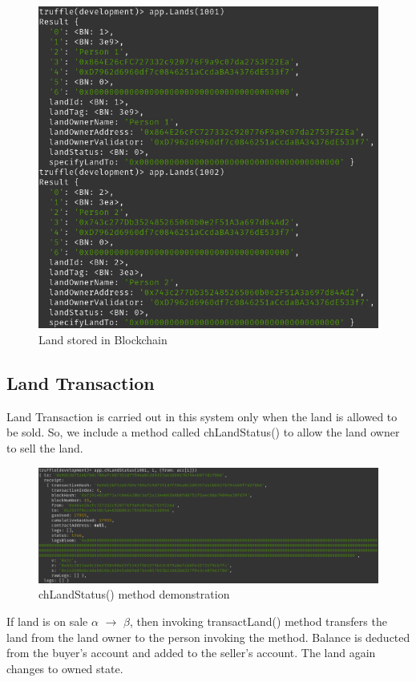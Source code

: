 \documentclass[11pt]{article}
\begin{document}
\begin{figure}[htbp]
\centering
\includegraphics[width=.9\linewidth]{./land-details-1-2.png}
\caption{Land stored in Blockchain}
\end{figure}

\subsection{Land Transaction}
\label{sec:orgff0bfd9}
Land Transaction is carried out in this system only when the land is allowed to be sold. So, we include a method called chLandStatus() to allow the land owner to sell the land.

\begin{figure}[htbp]
\centering
\includegraphics[width=.9\linewidth]{./change-land-status.png}
\caption{chLandStatus() method demonstration}
\end{figure}

If land is on sale \(\alpha\) \(\rightarrow\) \(\beta\), then invoking transactLand() method transfers the land from the land owner to the person invoking the method. Balance is deducted from the buyer's account and added to the seller's account. The land again changes to owned state. 
\end{document}
